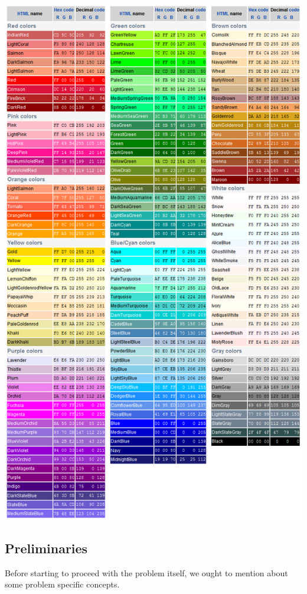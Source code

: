 \documentclass[egilmezThesis.tex]{subfiles}
\begin{document}
\begin{center}
\includegraphics[width=1\textwidth]{misc/colorTable.png}
\end{center}

\subsection{Preliminaries}
\label{prem}
Before starting to proceed with the problem itself, we ought to mention about some problem specific concepts.
\end{document}
